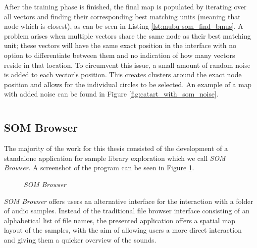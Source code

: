 \smallskip

After the training phase is finished, the final map is populated by iterating
over all vectors and finding their corresponding best matching units (meaning
that node which is closest), as can be seen in Listing
\ref{lst:mubu-som_find_bmus}. A problem arises when multiple vectors share the
same node as their best matching unit; these vectors will have the same exact
position in the interface with no option to differentiate between them and no
indication of how many vectors reside in that location. To circumvent this
issue, a small amount of random noise is added to each vector's position. This
creates clusters around the exact node position and allows for the individual
circles to be selected. An example of a map with added noise can be found in
Figure \ref{fig:catart_with_som_noise}.

\begin{listing}[!htb]
  \begin{mdframed}
    \inputminted[breaklines, numbers=left, firstline=316, lastline=335,
    fontsize=\footnotesize]{js}{../dev/mubu-som-js/descriptor_som.js}
  \end{mdframed}
  \caption[mubu-som-js/descriptor\_som.js: \gls{bmu} identification]
  {mubu-som-js/descriptor\_som.js: \glspl{bmu} for each vector are
  identified in \texttt{findBestMatches()}. This Listing implements
  equation \ref{eq:bmu} from Section \ref{subsubsec:som_math_definition}.}
  \label{lst:mubu-som_find_bmus}
\end{listing}

\clearpage

\subsection{SOM Browser}
\label{subsec:implementation_som-browser}

The majority of the work for this thesis consisted of the development of a
standalone application for sample library exploration which we call
\textit{SOM Browser}. A screenshot of the program can be seen in Figure
\ref{fig:som-browser}.

\begin{figure}[!htb]
  \centering
  \caption{\textit{SOM Browser}}
  \label{fig:som-browser}
\end{figure}

\textit{SOM Browser} offers users an alternative interface for the interaction
with a folder of audio samples. Instead of the traditional file browser
interface consisting of an alphabetical list of file names, the presented
application offers a spatial map layout of the samples, with the aim of allowing
users a more direct interaction and giving them a quicker overview of the
sounds.

